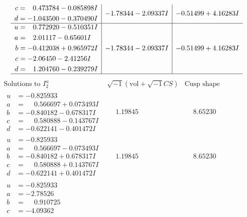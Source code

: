 \documentclass[1p]{elsarticle_modified}
\theoremstyle{definition}
\newcommand{\I}{\sqrt{-1}}
\begin{document}
$$\begin{array}{c|c|c}
\begin{aligned}
c &= \phantom{-}0.473784 - 0.085898 I \\
d &= -1.043500 - 0.370490 I\end{aligned}
 & -1.78344 - 2.09337 I & -0.51499 + 4.16283 I \\ \hline\begin{aligned}
u &= \phantom{-}0.772920 - 0.510351 I \\
a &= \phantom{-}2.01117 - 0.65601 I \\
b &= -0.412038 + 0.965972 I \\
c &= -2.06450 - 2.41256 I \\
d &= \phantom{-}1.204760 - 0.239279 I\end{aligned}
 & -1.78344 - 2.09337 I & -0.51499 + 4.16283 I\\
 \hline 
 \end{array}$$\newpage$$\begin{array}{c|c|c}  
\text{Solutions to }I^u_{2}& \I (\text{vol} + \sqrt{-1}CS) & \text{Cusp shape}\\
 \hline 
\begin{aligned}
u &= -0.825933\phantom{ +0.000000I} \\
a &= \phantom{-}0.566697 + 0.073493 I \\
b &= -0.840182 - 0.678317 I \\
c &= \phantom{-}0.580888 - 0.143767 I \\
d &= -0.622141 - 0.401472 I\end{aligned}
 & \phantom{-}1.19845\phantom{ +0.000000I} & \phantom{-}8.65230\phantom{ +0.000000I} \\ \hline\begin{aligned}
u &= -0.825933\phantom{ +0.000000I} \\
a &= \phantom{-}0.566697 - 0.073493 I \\
b &= -0.840182 + 0.678317 I \\
c &= \phantom{-}0.580888 + 0.143767 I \\
d &= -0.622141 + 0.401472 I\end{aligned}
 & \phantom{-}1.19845\phantom{ +0.000000I} & \phantom{-}8.65230\phantom{ +0.000000I} \\ \hline\begin{aligned}
u &= -0.825933\phantom{ +0.000000I} \\
a &= -2.78526\phantom{ +0.000000I} \\
b &= \phantom{-}0.910725\phantom{ +0.000000I} \\
c &= -4.09362\phantom{ +0.000000I} \\

\end{aligned}
\end{array}$$
\end{document}
